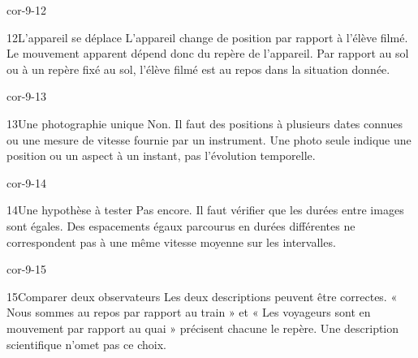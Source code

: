 \documentclass[12pt,twoside,openany]{book}
\begin{document}
\begin{blocLivre}{cor-9-12}
\begin{corrige}{12}{L’appareil se déplace}
L’appareil change de position par rapport à l’élève filmé. Le mouvement apparent dépend donc du repère de l’appareil. Par rapport au sol ou à un repère fixé au sol, l’élève filmé est au repos dans la situation donnée.\par
\end{corrige}\end{blocLivre}
\begin{blocLivre}{cor-9-13}
\begin{corrige}{13}{Une photographie unique}
Non. Il faut des positions à plusieurs dates connues ou une mesure de vitesse fournie par un instrument. Une photo seule indique une position ou un aspect à un instant, pas l’évolution temporelle.\par
\end{corrige}\end{blocLivre}
\begin{blocLivre}{cor-9-14}
\begin{corrige}{14}{Une hypothèse à tester}
Pas encore. Il faut vérifier que les durées entre images sont égales. Des espacements égaux parcourus en durées différentes ne correspondent pas à une même vitesse moyenne sur les intervalles.\par
\end{corrige}\end{blocLivre}
\begin{blocLivre}{cor-9-15}
\begin{corrige}{15}{Comparer deux observateurs}
Les deux descriptions peuvent être correctes. « Nous sommes au repos par rapport au train » et « Les voyageurs sont en mouvement par rapport au quai » précisent chacune le repère. Une description scientifique n’omet pas ce choix.\par
\end{corrige}\end{blocLivre}
\label{solutions-9}
\end{document}
